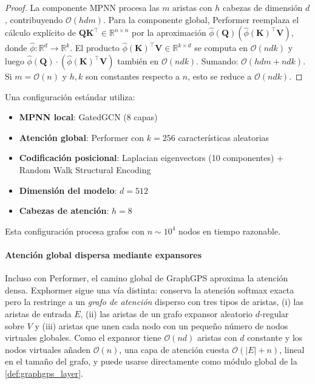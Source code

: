 \begin{proof}
La componente MPNN procesa las $m$ aristas con $h$ cabezas de dimensión $d$, contribuyendo $\mathcal{O}(hdm)$. Para la componente global, Performer reemplaza el cálculo explícito de $\mathbf{Q}\mathbf{K}^\top \in \mathbb{R}^{n \times n}$ por la aproximación $\hat{\phi}(\mathbf{Q})(\hat{\phi}(\mathbf{K})^\top \mathbf{V})$, donde $\hat{\phi}: \mathbb{R}^d \to \mathbb{R}^k$. El producto $\hat{\phi}(\mathbf{K})^\top \mathbf{V} \in \mathbb{R}^{k \times d}$ se computa en $\mathcal{O}(ndk)$ y luego $\hat{\phi}(\mathbf{Q}) \cdot (\hat{\phi}(\mathbf{K})^\top \mathbf{V})$ también en $\mathcal{O}(ndk)$. Sumando: $\mathcal{O}(hdm + ndk)$. Si $m = \mathcal{O}(n)$ y $h, k$ son constantes respecto a $n$, esto se reduce a $\mathcal{O}(ndk)$.
\end{proof}

\begin{example}\label{ex:graphgps_configuration}
Una configuración estándar utiliza:
\begin{itemize}
    \item \textbf{MPNN local}: GatedGCN (8 capas)
    \item \textbf{Atención global}: Performer con $k=256$ características aleatorias
    \item \textbf{Codificación posicional}: Laplacian eigenvectors (10 componentes) + Random Walk Structural Encoding
    \item \textbf{Dimensión del modelo}: $d=512$
    \item \textbf{Cabezas de atención}: $h=8$
\end{itemize}
Esta configuración procesa grafos con $n \sim 10^4$ nodos en tiempo razonable.
\end{example}


\paragraph{Atención global dispersa mediante expansores}

Incluso con Performer, el camino global de GraphGPS aproxima la atención densa. Exphormer \citep{shirzad2023exphormer} sigue una vía distinta: conserva la atención softmax exacta pero la restringe a un \emph{grafo de atención} disperso con tres tipos de aristas, (i) las aristas de entrada $E$, (ii) las aristas de un grafo expansor aleatorio $d$-regular sobre $V$ y (iii) aristas que unen cada nodo con un pequeño número de nodos virtuales globales. Como el expansor tiene $\mathcal{O}(nd)$ aristas con $d$ constante y los nodos virtuales añaden $\mathcal{O}(n)$, una capa de atención cuesta $\mathcal{O}(|E| + n)$, lineal en el tamaño del grafo, y puede usarse directamente como módulo global de la \autoref{def:graphgps_layer}.

